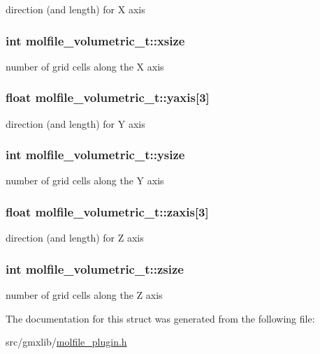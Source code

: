 direction (and length) for \-X axis \hypertarget{structmolfile__volumetric__t_a249ff6b46477c2ec63f49bad8238a112}{
\subsubsection[{xsize}]{\setlength{\rightskip}{0pt plus 5cm}int {\bf molfile\-\_\-volumetric\-\_\-t\-::xsize}}}\label{structmolfile__volumetric__t_a249ff6b46477c2ec63f49bad8238a112}
number of grid cells along the \-X axis \hypertarget{structmolfile__volumetric__t_a7894460a7b7ab25a63d2136cbe5f487d}{
\subsubsection[{yaxis}]{\setlength{\rightskip}{0pt plus 5cm}float {\bf molfile\-\_\-volumetric\-\_\-t\-::yaxis}\mbox{[}3\mbox{]}}}\label{structmolfile__volumetric__t_a7894460a7b7ab25a63d2136cbe5f487d}
direction (and length) for \-Y axis \hypertarget{structmolfile__volumetric__t_a81703da41da3cf91faf8d433d685f334}{
\subsubsection[{ysize}]{\setlength{\rightskip}{0pt plus 5cm}int {\bf molfile\-\_\-volumetric\-\_\-t\-::ysize}}}\label{structmolfile__volumetric__t_a81703da41da3cf91faf8d433d685f334}
number of grid cells along the \-Y axis \hypertarget{structmolfile__volumetric__t_a96986b72e7001fc709553c7f866fa56b}{
\subsubsection[{zaxis}]{\setlength{\rightskip}{0pt plus 5cm}float {\bf molfile\-\_\-volumetric\-\_\-t\-::zaxis}\mbox{[}3\mbox{]}}}\label{structmolfile__volumetric__t_a96986b72e7001fc709553c7f866fa56b}
direction (and length) for \-Z axis \hypertarget{structmolfile__volumetric__t_a31f1f776b5cf3f01f3658a6aecbeb7ce}{
\subsubsection[{zsize}]{\setlength{\rightskip}{0pt plus 5cm}int {\bf molfile\-\_\-volumetric\-\_\-t\-::zsize}}}\label{structmolfile__volumetric__t_a31f1f776b5cf3f01f3658a6aecbeb7ce}
number of grid cells along the \-Z axis 

\-The documentation for this struct was generated from the following file\-:\begin{DoxyCompactItemize}
\item 
src/gmxlib/\hyperlink{molfile__plugin_8h}{molfile\-\_\-plugin.\-h}\end{DoxyCompactItemize}

